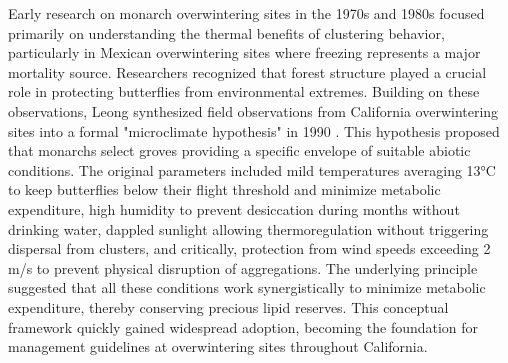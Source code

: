 Early research on monarch overwintering sites in the 1970s and 1980s focused primarily on understanding the thermal benefits of clustering behavior, particularly in Mexican overwintering sites where freezing represents a major mortality source. Researchers recognized that forest structure played a crucial role in protecting butterflies from environmental extremes. Building on these observations, Leong synthesized field observations from California overwintering sites into a formal "microclimate hypothesis" in 1990 \citep{leongMicroenvironmentalFactorsAssociated1990}. This hypothesis proposed that monarchs select groves providing a specific envelope of suitable abiotic conditions. The original parameters included mild temperatures averaging 13°C to keep butterflies below their flight threshold and minimize metabolic expenditure, high humidity to prevent desiccation during months without drinking water, dappled sunlight allowing thermoregulation without triggering dispersal from clusters, and critically, protection from wind speeds exceeding 2 m/s to prevent physical disruption of aggregations. The underlying principle suggested that all these conditions work synergistically to minimize metabolic expenditure, thereby conserving precious lipid reserves. This conceptual framework quickly gained widespread adoption, becoming the foundation for management guidelines at overwintering sites throughout California.

